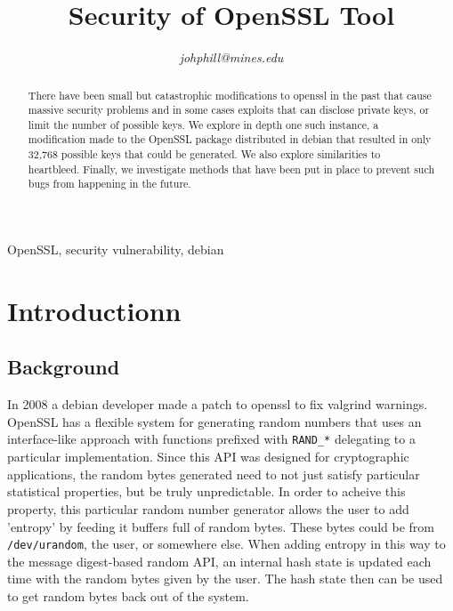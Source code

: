 \documentclass[conference]{IEEEtran}
\begin{document}
\title{Security of OpenSSL Tool}

\author{
\textit{johphill@mines.edu}\\
\and
{}
\and
{}
\and
{}
\and
{}
\and
{}
}

\maketitle

\begin{abstract}
There have been small but catastrophic modifications to openssl in the
past\cite{1}\cite{2}\cite{5} that cause massive security problems and
in some cases exploits that can disclose private keys, or limit the
number of possible keys. We explore in depth one such instance, a
modification made to the OpenSSL package distributed in debian that
resulted in only 32,768 possible keys that could be generated. We also
explore similarities to heartbleed. Finally, we investigate methods
that have been put in place to prevent such bugs from happening in the
future.
\end{abstract}

\begin{IEEEkeywords}
OpenSSL, security vulnerability, debian
\end{IEEEkeywords}

\section{Introductionn}
\subsection{Background}
In 2008 a debian developer made a patch to openssl to fix valgrind
warnings\cite{2}\cite{3}. OpenSSL has a flexible system for generating
random numbers that uses an interface-like approach with functions
prefixed with \verb|RAND_*| delegating to a particular
implementation. Since this API was designed for cryptographic
applications, the random bytes generated need to not just satisfy
particular statistical properties, but be truly unpredictable. In order
to acheive this property, this particular random number generator
allows the user to add 'entropy' by feeding it buffers full of random
bytes. These bytes could be from \verb|/dev/urandom|, the user, or
somewhere else. When adding entropy in this way to the message
digest-based random API, an internal hash state is updated each time
with the random bytes given by the user. The hash state then can be
used to get random bytes back out of the system. 
\end{document}

